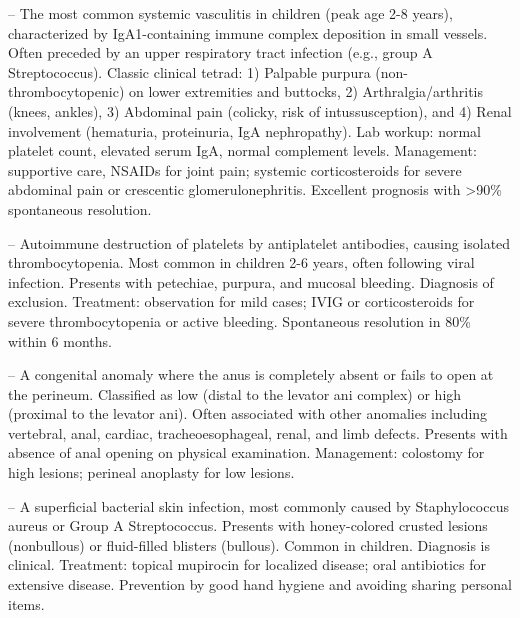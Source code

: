 -- The most common systemic vasculitis in children (peak age 2-8 years), characterized by IgA1-containing immune complex deposition in small vessels. Often preceded by an upper respiratory tract infection (e.g., group A Streptococcus). Classic clinical tetrad: 1) Palpable purpura (non-thrombocytopenic) on lower extremities and buttocks, 2) Arthralgia/arthritis (knees, ankles), 3) Abdominal pain (colicky, risk of intussusception), and 4) Renal involvement (hematuria, proteinuria, IgA nephropathy). Lab workup: normal platelet count, elevated serum IgA, normal complement levels. Management: supportive care, NSAIDs for joint pain; systemic corticosteroids for severe abdominal pain or crescentic glomerulonephritis. Excellent prognosis with >90\% spontaneous resolution.

-- Autoimmune destruction of platelets by antiplatelet antibodies, causing isolated thrombocytopenia. Most common in children 2-6 years, often following viral infection. Presents with petechiae, purpura, and mucosal bleeding. Diagnosis of exclusion. Treatment: observation for mild cases; IVIG or corticosteroids for severe thrombocytopenia or active bleeding. Spontaneous resolution in 80\% within 6 months.

-- A congenital anomaly where the anus is completely absent or fails to open at the perineum. Classified as low (distal to the levator ani complex) or high (proximal to the levator ani). Often associated with other anomalies including vertebral, anal, cardiac, tracheoesophageal, renal, and limb defects. Presents with absence of anal opening on physical examination. Management: colostomy for high lesions; perineal anoplasty for low lesions.

-- A superficial bacterial skin infection, most commonly caused by Staphylococcus aureus or Group A Streptococcus. Presents with honey-colored crusted lesions (nonbullous) or fluid-filled blisters (bullous). Common in children. Diagnosis is clinical. Treatment: topical mupirocin for localized disease; oral antibiotics for extensive disease. Prevention by good hand hygiene and avoiding sharing personal items.

